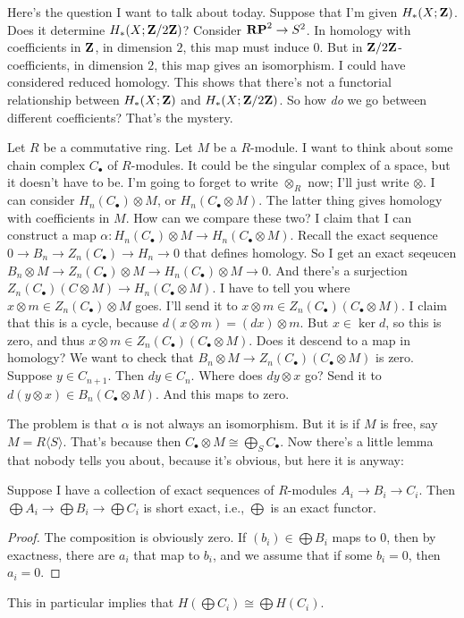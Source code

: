 Here's the question I want to talk about today. Suppose that I'm given $ H_\ast(X;\mathbf Z)$. Does it determine $ H_\ast(X;\mathbf Z/2\mathbf Z)$? Consider $\mathbf{RP}^2\to S^2$. In homology with coefficients in $\mathbf Z$, in dimension $2$, this map must induce $0$. But in $\mathbf Z/2\mathbf Z$-coefficients, in dimension $2$, this map gives an isomorphism. I could have considered reduced homology. This shows that there's not a functorial relationship between $ H_\ast(X;\mathbf Z)$ and $ H_\ast(X;\mathbf Z/2\mathbf Z)$. So how \emph{do} we go between different coefficients? That's the mystery.

Let $R$ be a commutative ring. Let $M$ be a $R$-module. I want to think about some chain complex $C_\bullet$ of $R$-modules. It could be the singular complex of a space, but it doesn't have to be. I'm going to forget to write $\otimes_R$ now; I'll just write $\otimes$. I can consider $ H_n(C_\bullet)\otimes M$, or $ H_n(C_\bullet\otimes M)$. The latter thing gives homology with coefficients in $M$. How can we compare these two? I claim that I can construct a map $\alpha: H_n(C_\bullet)\otimes M\to H_n(C_\bullet\otimes M)$. Recall the exact sequence $0\to B_n\to Z_n(C_\bullet)\to H_n\to 0$ that defines homology. So I get an exact seqeucen $B_n\otimes M\to Z_n(C_\bullet)\otimes M\to H_n(C_\bullet)\otimes M\to 0$. And there's a surjection $Z_n(C_\bullet)(C\otimes M)\to H_n(C_\bullet\otimes M)$. I have to tell you where $x\otimes m\in Z_n(C_\bullet)\otimes M$ goes. I'll send it to $x\otimes m\in Z_n(C_\bullet)(C_\bullet\otimes M)$. I claim that this is a cycle, because $d(x\otimes m)=(dx)\otimes m$. But $x\in\ker d$, so this is zero, and thus $x\otimes m\in Z_n(C_\bullet)(C_\bullet\otimes M)$. Does it descend to a map in homology? We want to check that $B_n\otimes M\to Z_n(C_\bullet)(C_\bullet\otimes M)$ is zero. Suppose $y\in C_{n+1}$. Then $dy\in C_n$. Where does $dy\otimes x$ go? Send it to $d(y\otimes x)\in B_n(C_\bullet\otimes M)$. And this maps to zero.

The problem is that $\alpha$ is not always an isomorphism. But it is if $M$ is free, say $M=R\langle S\rangle$. That's because then $C_\bullet\otimes M\cong\bigoplus_S C_\bullet$. Now there's a little lemma that nobody tells you about, because it's obvious, but here it is anyway:
\begin{lemma}
Suppose I have a collection of exact sequences of $R$-modules $A_i\to B_i\to C_i$. Then $\bigoplus A_i\to \bigoplus B_i\to \bigoplus C_i$ is short exact, i.e., $\bigoplus$ is an exact functor.
\end{lemma}
\begin{proof}
The composition is obviously zero. If $(b_i)\in\bigoplus B_i$ maps to $0$, then by exactness, there are $a_i$ that map to $b_i$, and we assume that if some $b_i=0$, then $a_i=0$.
\end{proof}
This in particular implies that $ H(\bigoplus C_i)\cong\bigoplus H(C_i)$.

